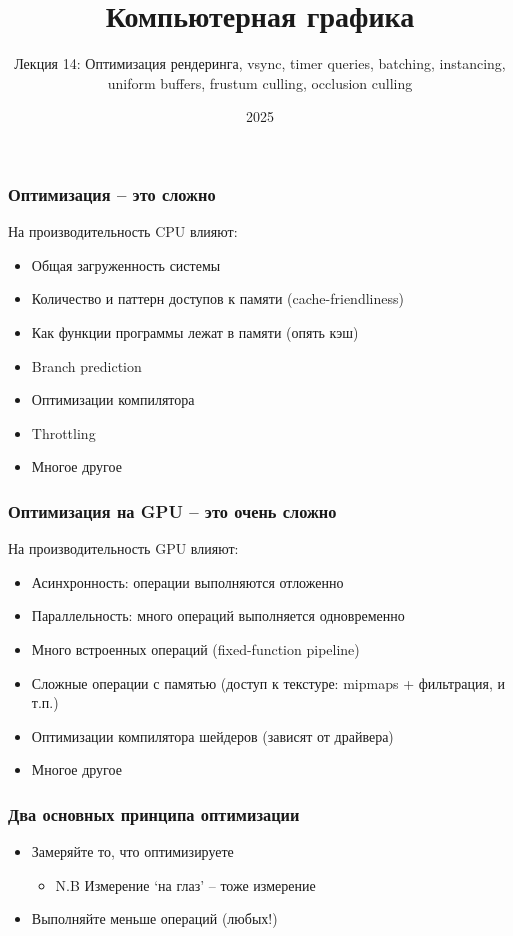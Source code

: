 \documentclass{beamer}
\title{Компьютерная графика}
\subtitle{Лекция 14: Оптимизация рендеринга, vsync, timer queries, batching, instancing, uniform buffers, frustum culling, occlusion culling}
\date{2025}
\begin{document}
\frame{\titlepage}

\begin{frame}[fragile]
\frametitle{Оптимизация -- это сложно}
На производительность CPU влияют:
\pause
\begin{itemize}
\item Общая загруженность системы
\pause
\item Количество и паттерн доступов к памяти (cache-friendliness)
\pause
\item Как функции программы лежат в памяти (опять кэш)
\pause
\item Branch prediction
\pause
\item Оптимизации компилятора
\pause
\item Throttling
\pause
\item Многое другое
\end{itemize}
\end{frame}

\begin{frame}[fragile]
\frametitle{Оптимизация на GPU -- это очень сложно}
На производительность GPU влияют:
\pause
\begin{itemize}
\item Асинхронность: операции выполняются отложенно
\pause
\item Параллельность: много операций выполняется одновременно
\pause
\item Много встроенных операций (fixed-function pipeline)
\pause
\item Сложные операции с памятью (доступ к текстуре: mipmaps + фильтрация, и т.п.)
\pause
\item Оптимизации компилятора шейдеров (зависят от драйвера)
\pause
\item Многое другое
\end{itemize}
\end{frame}

\begin{frame}[fragile]
\frametitle{Два основных принципа оптимизации}
\begin{itemize}
\item Замеряйте то, что оптимизируете
\pause
\begin{itemize}
\item N.B Измерение `на глаз' -- тоже измерение
\end{itemize}
\pause
\item Выполняйте меньше операций (любых!)
\end{itemize}
\end{frame}
\end{document}
